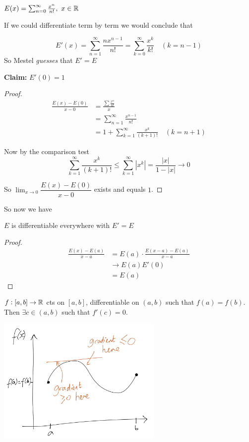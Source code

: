 \begin{example}
$E(x) = \sum_{n=0}^\infty \frac{x^n}{n!},~x\in\mathbb{R}$	

If we could differentiate term by term we would conclude that

\[E'(x) = \sum_{n=1}^\infty \frac{nx^{n-1}}{n!} = \sum_{k=0}^\infty \frac{x^k}{k!} \quad(k=n-1)\]
So Mestel \emph{guesses} that $E' = E$

\textbf{Claim:} $E'(0) = 1$
\begin{proof}
\[\begin{aligned}\frac{E(x) -E(0)}{x-0} &= \frac{\sum \frac{x^n}{n!}}{x}\\
&= \sum_{n=1}^\infty \frac{x^{n-1}}{n!}\\
&= 1 + \sum_{k=1}^\infty \frac{x^k}{(k+1)!} \quad(k = n+1)
\end{aligned}
\]

Now by the comparison test \[\sum_{k=1}^\infty \frac{x^k}{(k+1)!} \leq \sum_{k=1}^\infty |x^k| = \dfrac{|x|}{1-|x|} \to 0\]

So $\lim_{x\to 0} \dfrac{E(x) - E(0)}{x-0}$ exists and equals $1$. 
\end{proof}

So now we have
\begin{proposition}
$E$ is differentiable everywhere with $E' = E$	
\end{proposition}
\begin{proof}

\[\begin{aligned}
\frac{E(x) - E(a)}{x-a} &= E(a)\cdot \frac{E(x-a)-E(a)}{x-a}\\
 &\to E(a)E'(0) \\
&= E(a)	
\end{aligned}
\]	
\end{proof}
\end{example}\vspace*{15pt}


\vspace*{5pt}


\begin{theorem}
	$f:[a,b] \to \mathbb{R}$ cts on $[a,b]$, differentiable on $(a,b)$ such that $f(a) = f(b)$. Then $\exists c \in (a,b)$ such that $f'(c) = 0$.
\end{theorem}



\begin{center}
\includegraphics[width = 8cm]{rolle.jpg}
\end{center}


